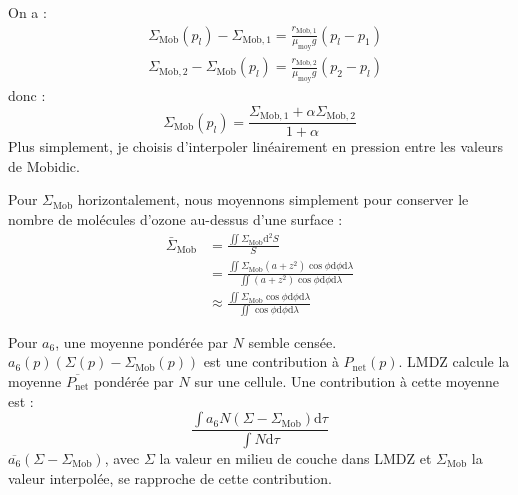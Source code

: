 \documentclass[a4paper,english,french]{article}
\newcommand{\ud}{\mathrm{d}}
\begin{document}
On a :
\begin{align*}
  & \Sigma_\mathrm{Mob}(p_l) - \Sigma_{\mathrm{Mob},1}
  = \frac{r_{\mathrm{Mob},1}}{\mu_\mathrm{moy} g} (p_l - p_1) \\
  & \Sigma_{\mathrm{Mob},2} - \Sigma_\mathrm{Mob}(p_l)
  = \frac{r_{\mathrm{Mob},2}}{\mu_\mathrm{moy} g} (p_2 - p_l)
\end{align*}
donc :
\begin{displaymath}
  \Sigma_\mathrm{Mob}(p_l) = \frac{\Sigma_{\mathrm{Mob},1} + \alpha \Sigma_{\mathrm{Mob},2}}{1 + \alpha}
\end{displaymath}
Plus simplement, je choisis d'interpoler linéairement en pression
entre les valeurs de Mobidic.

Pour $\Sigma_\mathrm{Mob}$ horizontalement, nous moyennons simplement pour
conserver le nombre de molécules d'ozone au-dessus d'une surface :
\begin{align*}
  \bar \Sigma_\mathrm{Mob} & = \frac{\iint \Sigma_\mathrm{Mob} \ud^2 S}{S} \\
  & =
  \frac{\iint \Sigma_\mathrm{Mob} (a + z^2) \cos\phi \ud \phi \ud \lambda}
  {\iint (a + z^2) \cos\phi \ud \phi \ud \lambda} \\
  & \approx \frac{\iint \Sigma_\mathrm{Mob} \cos\phi \ud \phi \ud \lambda}
  {\iint \cos\phi \ud \phi \ud \lambda}
\end{align*}

Pour $a_6$, une moyenne pondérée par $N$ semble censée. $a_6(p) (\Sigma(p) -
\Sigma_\mathrm{Mob}(p))$ est une contribution à
$P_\mathrm{net}(p)$. LMDZ calcule la moyenne
$\overline{P_\mathrm{net}}$ pondérée par $N$ sur une cellule. Une
contribution à cette moyenne est :
\begin{displaymath}
  \frac{\int a_6 N (\Sigma - \Sigma_\mathrm{Mob}) \ud \tau}{\int N \ud \tau}
\end{displaymath}
$\overline{a_6} (\Sigma - \Sigma_\mathrm{Mob})$, avec $\Sigma$ la
valeur en milieu de couche dans LMDZ et $\Sigma_\mathrm{Mob}$ la
valeur interpolée, se rapproche de cette contribution.
\end{document}
